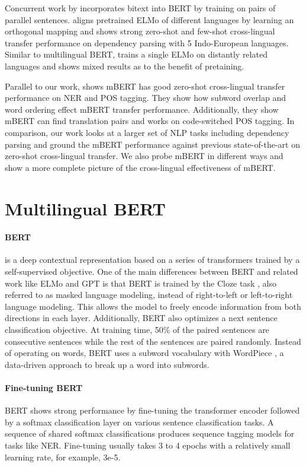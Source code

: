 \documentclass[11pt,a4paper]{article}
\begin{document}
Concurrent work by  incorporates bitext into BERT by training on pairs of parallel sentences.
 aligns pretrained ELMo of different languages by learning an orthogonal mapping and shows strong zero-shot and few-shot cross-lingual transfer performance on dependency parsing with 5 Indo-European languages.
Similar to multilingual BERT,  trains a single ELMo on distantly related languages and shows mixed results as to the benefit of pretaining.

Parallel to our work,  shows mBERT has good zero-shot cross-lingual transfer performance on NER and POS tagging. They show how subword overlap and word ordering effect mBERT transfer performance. Additionally, they show mBERT can find translation pairs and works on code-switched POS tagging.
In comparison, our work looks at a larger set of NLP tasks including dependency parsing and ground the mBERT performance against previous state-of-the-art on zero-shot cross-lingual transfer. We also probe mBERT in different ways and show a more complete picture of the cross-lingual effectiveness of mBERT.


\section{Multilingual BERT}
\label{sec:mBERT}

\paragraph{BERT} \cite{devlin-etal-2019-bert} is a deep contextual representation based on a series of transformers trained by a self-supervised objective. One of the main differences between BERT and related work like ELMo and GPT is that BERT is trained by the Cloze task \cite{taylor1953cloze}, also referred to as masked language modeling, instead of right-to-left or left-to-right language modeling. This allows the model to freely encode information from both directions in each layer. 
Additionally, BERT also optimizes a next sentence classification objective. At training time, 50\% of the paired sentences are consecutive sentences while the rest of the sentences are paired randomly.
Instead of operating on words, BERT uses a subword vocabulary with WordPiece \cite{wu2016google}, a data-driven approach to break up a word into subwords.

\paragraph{Fine-tuning BERT}
BERT shows strong performance by fine-tuning the transformer encoder followed by a softmax classification layer on various sentence classification tasks. A sequence of shared softmax classifications produces sequence tagging models for tasks like NER. Fine-tuning usually takes 3 to 4 epochs with a relatively small learning rate, for example, 3e-5.
\end{document}
